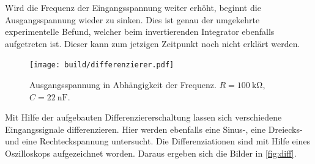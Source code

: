 Wird die Frequenz der Eingangsspannung weiter erhöht, beginnt die Ausgangsspannung
wieder zu sinken.
Dies ist genau der umgekehrte experimentelle Befund, welcher beim invertierenden Integrator
ebenfalls aufgetreten ist.
Dieser kann zum jetzigen Zeitpunkt noch nicht erklärt werden.
\begin{figure}
    \centering
    \texttt{[image: build/differenzierer.pdf]}
    \caption{Ausgangsspannung in Abhängigkeit der Frequenz. $R = \SI{100}{\kilo\ohm}$,
        $C = \SI{22}{\nano\farad}$.}
    \label{fig:differenzierer}
\end{figure}
\FloatBarrier
Mit Hilfe der aufgebauten Differenziererschaltung lassen sich verschiedene Eingangssignale 
differenzieren. 
Hier werden ebenfalls eine Sinus-, eine Dreiecks- und eine Rechteckspannung 
untersucht.
Die Differenziationen sind mit Hilfe eines Oszilloskops aufgezeichnet worden.
Daraus ergeben sich die Bilder in \autoref{fig:diff}.
